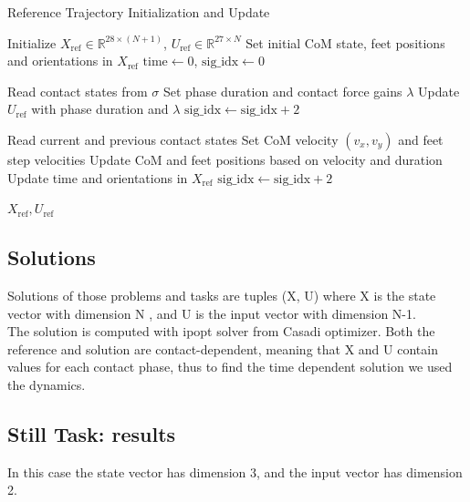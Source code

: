 \documentclass[main.tex]{subfiles}
\begin{document}
\begin{algorithm}[H]
\caption{Reference Trajectory Initialization and Update}
\begin{algorithmic}[1]
\State Initialize $X_{\text{ref}} \in \mathbb{R}^{28 \times (N+1)}$, $U_{\text{ref}} \in \mathbb{R}^{27 \times N}$
\State Set initial CoM state, feet positions and orientations in $X_{\text{ref}}$
\State $\text{time} \gets 0$, $\text{sig\_idx} \gets 0$

    \State Read contact states from $\sigma$
    \State Set phase duration and contact force gains $\lambda$
    \State Update $U_{\text{ref}}$ with phase duration and $\lambda$
    \State $\text{sig\_idx} \gets \text{sig\_idx} + 2$
\EndFor

    \State Read current and previous contact states
    \State Set CoM velocity $(v_x, v_y)$ and feet step velocities
    \State Update CoM and feet positions based on velocity and duration
    \State Update time and orientations in $X_{\text{ref}}$
    \State $\text{sig\_idx} \gets \text{sig\_idx} + 2$
\EndFor

\State \Return $X_{\text{ref}}, U_{\text{ref}}$
\end{algorithmic}
\end{algorithm}


\subsection{Solutions}
Solutions of those problems and tasks are tuples (X, U) where X is the state vector with dimension N , and U is the input vector with dimension N-1.
\\The solution is computed with ipopt solver from Casadi optimizer. Both the reference and solution are contact-dependent, meaning that X and U contain values for each contact phase, thus to find the time dependent solution we used the dynamics. 

\subsection{Still Task: results}
In this case the state vector has dimension 3, and the input vector has dimension 2.
\end{document}
